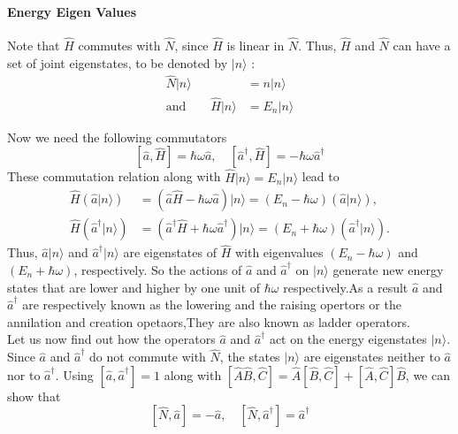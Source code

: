    \paragraph{Energy Eigen Values}
   Note that $\hat{H}$  commutes with $\hat{N}$, since $\hat{H}$ is linear in $\hat{N}$. Thus, $\hat{H}$ and $\hat{N}$ can have a set of joint eigenstates, to be denoted by $|n\rangle$ :
   	$$
   	\begin{aligned}
   	 \hat{N}|n\rangle&=n|n\rangle\\
   	  \text{and}\qquad
   	  \hat{H}|n\rangle&=E_{n}|n\rangle
   \end{aligned}
   $$
 
   Now we need the following commutators\\
$$[\hat{a}, \hat{H}]=\hbar \omega \hat{a}, \quad\left[\hat{a}^{\dagger}, \hat{H}\right]=-\hbar \omega \hat{a}^{\dagger}$$
These commutation relation along with  $\hat{H}|n\rangle=E_{n}|n\rangle$ lead to
$$\begin{aligned}
	\hat{H}(\hat{a}|n\rangle) &=(\hat{a} \hat{H}-\hbar \omega \hat{a})|n\rangle=\left(E_{n}-\hbar \omega\right)(\hat{a}|n\rangle), \\
	\hat{H}\left(\hat{a}^{\dagger}|n\rangle\right) &=\left(\hat{a}^{\dagger} \hat{H}+\hbar \omega \hat{a}^{\dagger}\right)|n\rangle=\left(E_{n}+\hbar \omega\right)\left(\hat{a}^{\dagger}|n\rangle\right) .
\end{aligned}$$
Thus, $\hat{a}|n\rangle$ and $\hat{a}^{\dagger}|n\rangle$ are eigenstates of $\hat{H}$ with eigenvalues $\left(E_{n}-\hbar \omega\right)$ and $\left(E_{n}+\hbar \omega\right)$, respectively. So the actions of $\hat{a}$ and $\hat{a}^{\dagger}$ on $|n\rangle$ generate new energy states that are lower and higher by one unit of $\hbar \omega$ respectively.As a result $\hat{a}$ and $\hat{a}^{\dagger}$ are respectively known as the lowering and the raising opertors or the annilation and creation opetaors,They are also known as ladder operators.\\
Let us now find out how the operators $\hat{a}$ and $\hat{a}^{\dagger}$ act on the energy eigenstates $|n\rangle$. Since $\hat{a}$ and $\hat{a}^{\dagger}$ do not commute with $\hat{N}$, the states $|n\rangle$ are eigenstates neither to $\hat{a}$ nor to $\hat{a}^{\dagger}$. Using $ \left[\hat{a}, \hat{a}^{\dagger}\right]=1$ along with $[\hat{A} \hat{B}, \hat{C}]=\hat{A}[\hat{B}, \hat{C}]+[\hat{A}, \hat{C}] \hat{B}$, we can show that\\
$$[\hat{N}, \hat{a}]=-\hat{a}, \quad\left[\hat{N}, \hat{a}^{\dagger}\right]=\hat{a}^{\dagger}$$
